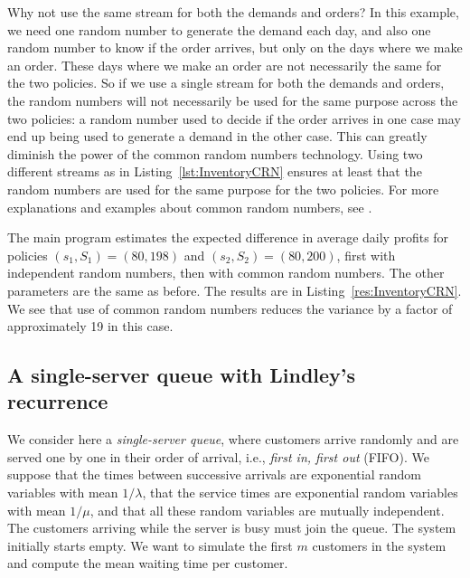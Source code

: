 Why not use the same stream for both the demands and orders?
In this example, we need one random number to generate the demand each day,
and also one random number to know if the order arrives, but only on the days
where we make an order.  These days where we make an order are not
necessarily the same for the two policies.
So if we use a single stream for both the demands and orders,
the random numbers will not necessarily be used for the same purpose across
the two policies: a random number used to decide if the order arrives in one case
may end up being used to generate a demand in the other case.
This can greatly diminish the power of the common random numbers technology.
Using two different streams as in Listing~\ref{lst:InventoryCRN} ensures
at least that the random numbers are used for the same purpose for the
two policies.  For more explanations and examples about common random numbers,
see \cite{sLAW00a,sLEC09a}.

The main program estimates the expected difference in average
daily profits for policies $(s_1, S_1) = (80, 198)$ and
$(s_2, S_2) = (80, 200)$, first with independent random numbers,
then with common random numbers.
The other parameters are the same as before.
The results are in Listing~\ref{res:InventoryCRN}.
We see that use of common random numbers reduces the variance by
a factor of approximately 19 in this case.




\subsection {A single-server queue with Lindley's recurrence}
\label {sec:queue-lindley}

We consider here a {\em single-server queue}, where customers
arrive randomly and are served one by one in their order of arrival,
i.e., {\em first in, first out\/} (FIFO).
We suppose that the times between successive arrivals are exponential
random variables with mean $1/\lambda$, that the service times are exponential
random variables with mean $1/\mu$, and that all these random variables are
mutually independent.
The customers arriving while the server is busy must join the queue.
The system initially starts empty.  We want to simulate the first
$m$ customers in the system and compute the mean waiting time per customer.

